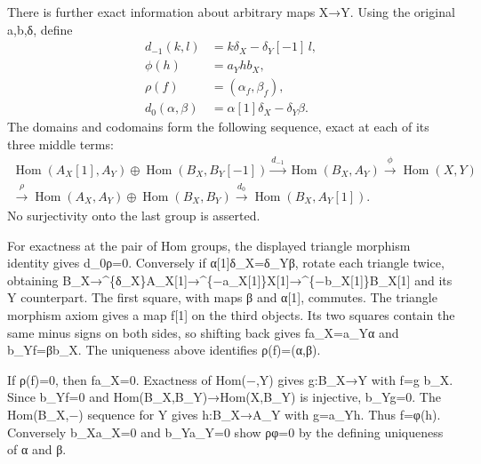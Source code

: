 \documentclass[11pt]{article}
\begin{document}
There is further exact information about arbitrary maps X\allowbreak{}→Y. Using the original a,\allowbreak{}b,\allowbreak{}δ,\allowbreak{} define \[
\begin{aligned}
 d_{-1}(k,l)&=k\delta_X-\delta_Y[-1]\,l,\\
 \phi(h)&=a_Yh b_X,\\
 \rho(f)&=(\alpha_f,\beta_f),\\
 d_0(\alpha,\beta)&=\alpha[1]\delta_X-\delta_Y\beta.
\end{aligned}
\] The domains and codomains form the following sequence,\allowbreak{} exact at each of its three middle terms:\allowbreak{} \[
\begin{gathered}
 \operatorname{Hom}(A_X[1],A_Y)\oplus
 \operatorname{Hom}(B_X,B_Y[-1])
 \xrightarrow{d_{-1}}\operatorname{Hom}(B_X,A_Y)
 \xrightarrow{\phi}\operatorname{Hom}(X,Y)\\
 \xrightarrow{\rho}
 \operatorname{Hom}(A_X,A_Y)\oplus\operatorname{Hom}(B_X,B_Y)
 \xrightarrow{d_0}\operatorname{Hom}(B_X,A_Y[1]).
 \tag{5.1}
\end{gathered}
\] No surjectivity onto the last group is asserted.

For exactness at the pair of Hom groups,\allowbreak{} the displayed triangle morphism identity gives d\_\allowbreak{}0ρ\allowbreak{}=0. Conversely if α[1]\allowbreak{}δ\_\allowbreak{}X\allowbreak{}=δ\_\allowbreak{}Yβ,\allowbreak{} rotate each triangle twice,\allowbreak{} obtaining B\_\allowbreak{}X\allowbreak{}→\textasciicircum{}\{δ\_\allowbreak{}X\}A\_\allowbreak{}X[1]\allowbreak{}\allowbreak{}→\textasciicircum{}\{−a\_\allowbreak{}X[1]\allowbreak{}\}X[1]\allowbreak{}\allowbreak{}→\textasciicircum{}\{−b\_\allowbreak{}X[1]\allowbreak{}\}B\_\allowbreak{}X[1]\allowbreak{} and its Y counterpart. The first square,\allowbreak{} with maps β and α[1]\allowbreak{},\allowbreak{} commutes. The triangle morphism axiom gives a map f[1]\allowbreak{} on the third objects. Its two squares contain the same minus signs on both sides,\allowbreak{} so shifting back gives fa\_\allowbreak{}X\allowbreak{}=a\_\allowbreak{}Yα and b\_\allowbreak{}Yf\allowbreak{}=βb\_\allowbreak{}X. The uniqueness above identifies ρ(f)\allowbreak{}\allowbreak{}=(α,\allowbreak{}β)\allowbreak{}.

If ρ(f)\allowbreak{}\allowbreak{}=0,\allowbreak{} then fa\_\allowbreak{}X\allowbreak{}=0. Exactness of Hom(−,\allowbreak{}Y)\allowbreak{} gives g:\allowbreak{}B\_\allowbreak{}X\allowbreak{}→Y with f\allowbreak{}=g b\_\allowbreak{}X. Since b\_\allowbreak{}Yf\allowbreak{}=0 and Hom(B\_\allowbreak{}X,\allowbreak{}B\_\allowbreak{}Y)\allowbreak{}\allowbreak{}→Hom(X,\allowbreak{}B\_\allowbreak{}Y)\allowbreak{} is injective,\allowbreak{} b\_\allowbreak{}Yg\allowbreak{}=0. The Hom(B\_\allowbreak{}X,\allowbreak{}−)\allowbreak{} sequence for Y gives h:\allowbreak{}B\_\allowbreak{}X\allowbreak{}→A\_\allowbreak{}Y with g\allowbreak{}=a\_\allowbreak{}Yh. Thus f\allowbreak{}=φ(h)\allowbreak{}. Conversely b\_\allowbreak{}Xa\_\allowbreak{}X\allowbreak{}=0 and b\_\allowbreak{}Ya\_\allowbreak{}Y\allowbreak{}=0 show ρφ\allowbreak{}=0 by the defining uniqueness of α and β.
\end{document}
